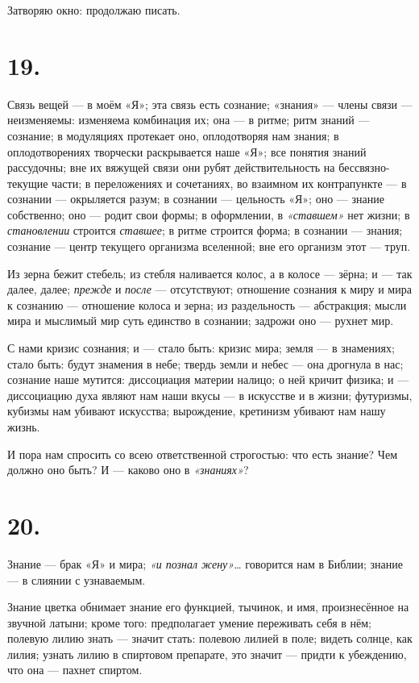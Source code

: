 \documentclass[12pt,a4paper,oneside]{book}
\begin{document}
Затворяю окно: продолжаю писать.

\section*{19.}

Связь вещей — в моём «Я»; эта связь есть сознание; «знания» — члены связи — неизменяемы: изменяема комбинация их; она — в ритме; ритм знаний — сознание; в модуляциях протекает оно, оплодотворяя нам знания; в оплодотворениях творчески раскрывается наше «Я»; все понятия знаний рассудочны; вне их вяжущей связи они рубят действительность на бессвязно-текущие части; в переложениях и сочетаниях, во взаимном их контрапункте — в сознании — окрыляется разум; в сознании — цельность «Я»; оно — знание собственно; оно — родит свои формы; в оформлении, в \emph{«ставшем»} нет жизни; в \emph{становлении} строится \emph{ставшее}; в ритме строится форма; в сознании — знания; сознание — центр текущего организма вселенной; вне его организм этот — труп.

Из зерна бежит стебель; из стебля наливается колос, а в колосе — зёрна; и — так далее, далее; \emph{прежде} и \emph{после} — отсутствуют; отношение сознания к миру и мира к сознанию — отношение колоса и зерна; из раздельность — абстракция; мысли мира и мыслимый мир суть единство в сознании; задрожи оно — рухнет мир.

С нами кризис сознания; и — стало быть: кризис мира; земля — в знамениях; стало быть: будут знамения в небе; твердь земли и небес — она дрогнула в нас; сознание наше мутится: диссоциация материи налицо; о ней кричит физика; и — диссоциацию духа являют нам наши вкусы — в искусстве и в жизни; футуризмы, кубизмы нам убивают искусства; вырождение, кретинизм убивают нам нашу жизнь.

И пора нам спросить со всею ответственной строгостью: что есть знание? Чем должно оно быть? И — каково оно в \emph{«знаниях»}?

\section*{20.}

Знание — брак «Я» и мира; \emph{«и познал жену»}… говорится нам в Библии; знание — в слиянии с узнаваемым.

Знание цветка обнимает знание его функцией, тычинок, и имя, произнесённое на звучной латыни; кроме того: предполагает умение переживать себя в нём; полевую лилию знать — значит стать: полевою лилией в поле; видеть солнце, как лилия; узнать лилию в спиртовом препарате, это значит — придти к убеждению, что она — пахнет спиртом.
\end{document}
